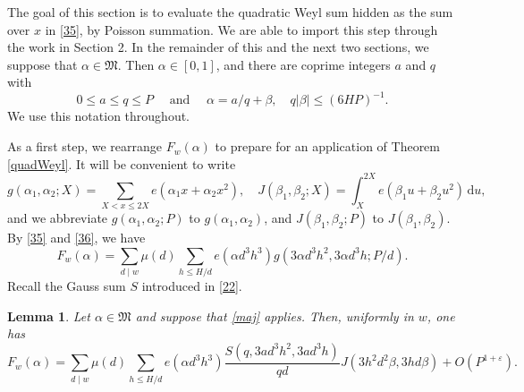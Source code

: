 \documentclass[reqno]{amsart}
\newcommand\dd{{\mathrm d}}
\newtheorem{lemma}[thm]{Lemma}
\numberwithin{equation}{section}
\begin{document}
The goal of this section is to evaluate the quadratic Weyl sum hidden as the sum over $x$ in \eqref{35}, by Poisson summation. We are able to import this step through the work in Section 2.  
In the remainder of this and the next two sections, we suppose that $\alpha\in\mathfrak M$. Then $\alpha\in [0,1]$, and there are coprime integers $a$ and $q$ with
\begin{equation}\label{maj} 0\le a\le q\le P \quad \text{ and } \quad\alpha = a/q +\beta, \quad q|\beta|\le (6HP)^{-1}. \end{equation}
We use this notation throughout.

As a first step, we rearrange $F_w(\alpha)$ to prepare for an application of 
Theorem \ref{quadWeyl}. It will be convenient to write
\begin{equation}\label{37} g(\alpha_1,\alpha_2;X) = \sum_{X<x\le 2X} e(\alpha_1 x+\alpha_2 x^2), \quad J(\beta_1,\beta_2;X) = \int_X^{2X} e(\beta_1 u+\beta_2 u^2)\,\dd u, \end{equation}
and we abbreviate $g(\alpha_1,\alpha_2;P)$ to $g(\alpha_1,\alpha_2)$, and 
$J(\beta_1,\beta_2;P)$ to $J(\beta_1,\beta_2)$. By \eqref{35} and \eqref{36}, we have
\begin{equation}\label{38} F_w(\alpha) = \sum_{d\mid w} \mu(d) \sum_{h\le H/d} e(\alpha d^3h^3)
g(3\alpha d^3h^2, 3\alpha d^3h; P/d). \end{equation}
Recall the Gauss sum $S$ introduced in \eqref{22}.

\begin{lemma}\label{L34} Let $\alpha\in\mathfrak M$  and suppose that \eqref{maj} applies. Then, uniformly in $w$, one has
$$ F_w(\alpha) = \sum_{d\mid w}\mu(d) \sum_{h\le H/d} e(\alpha d^3 h^3)
\frac{S(q,3ad^3h^2,3ad^3h)}{qd} J(3h^2d^2\beta, 3hd\beta) + O(P^{1+\varepsilon}).$$ 
\end{lemma}
 
\end{document}
